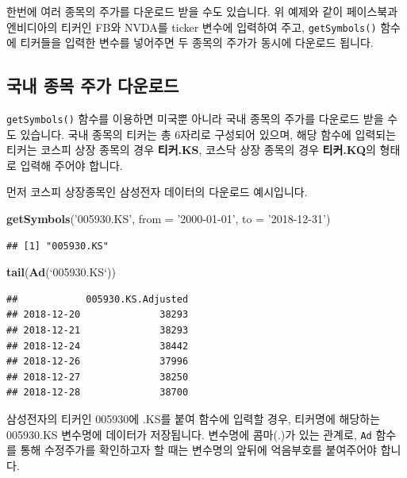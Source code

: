 \documentclass[12pt,]{book}
\newenvironment{Shaded}{\begin{snugshade}}{\end{snugshade}}
\newcommand{\DataTypeTok}[1]{\textcolor[rgb]{0.13,0.29,0.53}{#1}}
\newcommand{\KeywordTok}[1]{\textcolor[rgb]{0.13,0.29,0.53}{\textbf{#1}}}
\newcommand{\NormalTok}[1]{#1}
\newcommand{\StringTok}[1]{\textcolor[rgb]{0.31,0.60,0.02}{#1}}
\begin{document}
한번에 여러 종목의 주가를 다운로드 받을 수도 있습니다. 위 예제와 같이 페이스북과 엔비디아의 티커인 FB와 NVDA를 ticker 변수에 입력하여 주고, \texttt{getSymbols()} 함수에 티커들을 입력한 변수를 넣어주면 두 종목의 주가가 동시에 다운로드 됩니다.

\hypertarget{section-11}{%
\subsection{국내 종목 주가 다운로드}\label{section-11}}

\texttt{getSymbols()} 함수를 이용하면 미국뿐 아니라 국내 종목의 주가를 다운로드 받을 수도 있습니다. 국내 종목의 티커는 총 6자리로 구성되어 있으며, 해당 함수에 입력되는 티커는 코스피 상장 종목의 경우 \textbf{티커.KS}, 코스닥 상장 종목의 경우 \textbf{티커.KQ}의 형태로 입력해 주어야 합니다.

먼저 코스피 상장종목인 삼성전자 데이터의 다운로드 예시입니다.

\begin{Shaded}
\begin{Highlighting}[]
\KeywordTok{getSymbols}\NormalTok{(}\StringTok{'005930.KS'}\NormalTok{,}
           \DataTypeTok{from =} \StringTok{'2000-01-01'}\NormalTok{, }\DataTypeTok{to =} \StringTok{'2018-12-31'}\NormalTok{)}
\end{Highlighting}
\end{Shaded}

\begin{verbatim}
## [1] "005930.KS"
\end{verbatim}

\begin{Shaded}
\begin{Highlighting}[]
\KeywordTok{tail}\NormalTok{(}\KeywordTok{Ad}\NormalTok{(}\StringTok{`}\DataTypeTok{005930.KS}\StringTok{`}\NormalTok{))}
\end{Highlighting}
\end{Shaded}

\begin{verbatim}
##            005930.KS.Adjusted
## 2018-12-20              38293
## 2018-12-21              38293
## 2018-12-24              38442
## 2018-12-26              37996
## 2018-12-27              38250
## 2018-12-28              38700
\end{verbatim}

삼성전자의 티커인 005930에 .KS를 붙여 함수에 입력할 경우, 티커명에 해당하는 005930.KS 변수명에 데이터가 저장됩니다. 변수명에 콤마(.)가 있는 관계로, \texttt{Ad} 함수를 통해 수정주가를 확인하고자 할 때는 변수명의 앞뒤에 억음부호를 붙여주어야 합니다.
\end{document}
